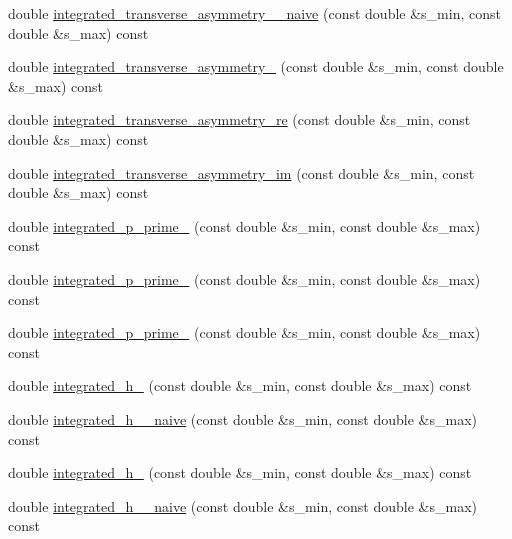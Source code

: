 \begin{DoxyCompactItemize}
double \hyperlink{classeos_1_1BToKstarDilepton_3_01LowRecoil_01_4_ab2348dd3ac8e0d2d853b8c35d75a4a2b}{integrated\_\-transverse\_\-asymmetry\_\_\-naive} (const double \&s\_\-min, const double \&s\_\-max) const 
\item 
double \hyperlink{classeos_1_1BToKstarDilepton_3_01LowRecoil_01_4_ae61a3da96c051d1b5da3bb7fcd1b42bc}{integrated\_\-transverse\_\-asymmetry\_} (const double \&s\_\-min, const double \&s\_\-max) const 
\item 
double \hyperlink{classeos_1_1BToKstarDilepton_3_01LowRecoil_01_4_a37f2d54a7ebd46bece004e8154b1b581}{integrated\_\-transverse\_\-asymmetry\_\-re} (const double \&s\_\-min, const double \&s\_\-max) const 
\item 
double \hyperlink{classeos_1_1BToKstarDilepton_3_01LowRecoil_01_4_af3583a95af682bacc01b1c44aa3f972b}{integrated\_\-transverse\_\-asymmetry\_\-im} (const double \&s\_\-min, const double \&s\_\-max) const 
\item 
double \hyperlink{classeos_1_1BToKstarDilepton_3_01LowRecoil_01_4_a968b483ff53e3a67d8b0887d8f894467}{integrated\_\-p\_\-prime\_} (const double \&s\_\-min, const double \&s\_\-max) const 
\item 
double \hyperlink{classeos_1_1BToKstarDilepton_3_01LowRecoil_01_4_a00fccd39baa4ef40ce1df88e790479c2}{integrated\_\-p\_\-prime\_} (const double \&s\_\-min, const double \&s\_\-max) const 
\item 
double \hyperlink{classeos_1_1BToKstarDilepton_3_01LowRecoil_01_4_adf3ffad49e2311d7d112d7af53948002}{integrated\_\-p\_\-prime\_} (const double \&s\_\-min, const double \&s\_\-max) const 
\item 
double \hyperlink{classeos_1_1BToKstarDilepton_3_01LowRecoil_01_4_a48ef64b2365fb8a709bee76c27122006}{integrated\_\-h\_} (const double \&s\_\-min, const double \&s\_\-max) const 
\item 
double \hyperlink{classeos_1_1BToKstarDilepton_3_01LowRecoil_01_4_a39d76e0ebc3397bfd09e3e5574e3d279}{integrated\_\-h\_\_\-naive} (const double \&s\_\-min, const double \&s\_\-max) const 
\item 
double \hyperlink{classeos_1_1BToKstarDilepton_3_01LowRecoil_01_4_a0d85c6d185e67dac3c1f618e6843dcdd}{integrated\_\-h\_} (const double \&s\_\-min, const double \&s\_\-max) const 
\item 
double \hyperlink{classeos_1_1BToKstarDilepton_3_01LowRecoil_01_4_ae7215ebd2b9553001309c90d70e3bec5}{integrated\_\-h\_\_\-naive} (const double \&s\_\-min, const double \&s\_\-max) const 

\end{DoxyCompactItemize}
